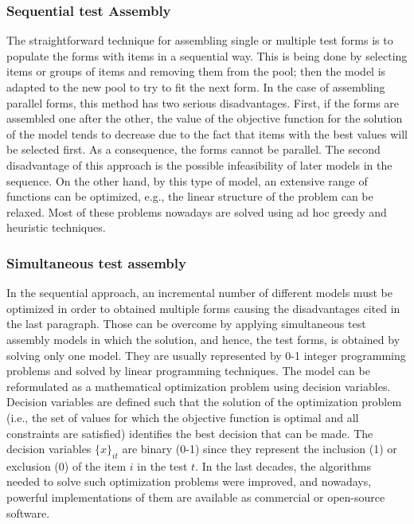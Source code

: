 \subsubsection{Sequential test Assembly}

The straightforward technique for assembling single or multiple test forms is to populate the forms with items in a sequential way. This is being done by selecting items or groups of items and removing them from the pool; then the model is adapted to the new pool to try to fit the next form. 
In the case of assembling parallel forms, this method has two serious disadvantages.
First, if the forms are assembled one after the other, the value of the objective function for the solution of the model tends to decrease due to the fact that items with the best values will be selected first.
As a consequence, the forms cannot be parallel.
The second disadvantage of this approach is the possible infeasibility of later models in the sequence.
On the other hand, by this type of model, an extensive range of functions can be optimized, e.g., the linear structure of the problem can be relaxed.
Most of these problems nowadays are solved using ad hoc greedy and heuristic techniques.

\subsubsection{Simultaneous test assembly}

In the sequential approach, an incremental number of different models must be optimized in order to obtained multiple forms causing the disadvantages cited in the last paragraph.
Those can be overcome by applying simultaneous test assembly models in which the solution, and hence, the test forms, is obtained by solving only one model.
They are usually represented by 0-1 integer programming problems and solved by linear programming techniques.
The model can be reformulated as a mathematical optimization problem using decision variables.
Decision variables are defined such that the solution of the optimization problem (i.e., the set of values for which the objective function is optimal and all constraints are satisfied) identifies the best decision that can be made.
The decision variables $\{x\}_{it}$ are binary (0-1) since they represent the inclusion (1) or exclusion (0) of the item $i$ in the test $t$.
In the last decades, the algorithms needed to solve such optimization problems were improved, and nowadays, powerful implementations of them are available as commercial or open-source software.

